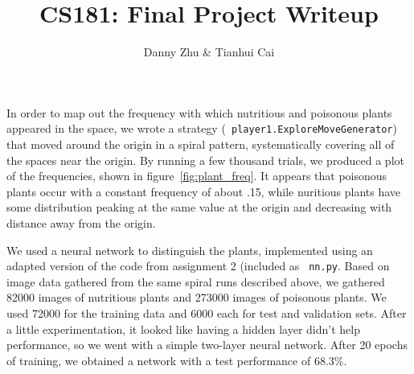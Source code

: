 \documentclass{article}
\title{CS181: Final Project Writeup}
\author{Danny Zhu \& Tianhui Cai}
\begin{document}
\maketitle


In order to map out the frequency with which nutritious and poisonous
plants appeared in the space, we wrote a strategy ({\tt
  player1.ExploreMoveGenerator}) that moved around the origin in a
spiral pattern, systematically covering all of the spaces near the
origin. By running a few thousand trials, we produced a plot of the
frequencies, shown in figure~\ref{fig:plant_freq}. It appears that
poisonous plants occur with a constant frequency of about .15, while
nuritious plants have some distribution peaking at the same value at
the origin and decreasing with distance away from the origin.

We used a neural network to distinguish the plants, implemented using
an adapted version of the code from assignment 2 (included as {\tt
  nn.py}. Based on image data gathered from the same spiral runs
described above, we gathered 82000 images of nutritious plants and
273000 images of poisonous plants. We used 72000 for the training data
and 6000 each for test and validation sets. After a little
experimentation, it looked like having a hidden layer didn't help
performance, so we went with a simple two-layer neural network. After
20 epochs of training, we obtained a network with a test performance
of $68.3\%$.
\end{document}
